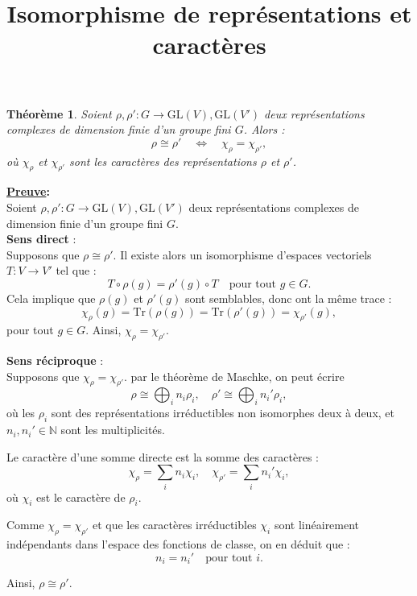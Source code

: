 \documentclass[12pt]{article}
\title{Isomorphisme de représentations et caractères}
\author{}
\date{}
\newtheorem{theoreme}{Théorème}
\begin{document}
	
	\maketitle
	
	\begin{theoreme}
		Soient \( \rho, \rho' : G \to \mathrm{GL}(V), \mathrm{GL}(V') \) deux représentations complexes de dimension finie d’un groupe fini \( G \). Alors :
		\[
		\rho \cong \rho' \quad \Leftrightarrow \quad \chi_\rho = \chi_{\rho'},
		\]
		où \( \chi_\rho \) et \( \chi_{\rho'} \) sont les caractères des représentations \( \rho \) et \( \rho' \).
	\end{theoreme}
	
	\textbf{\underline{Preuve}:}\\
Soient \( \rho, \rho' : G \to \mathrm{GL}(V), \mathrm{GL}(V') \) deux représentations complexes de dimension finie d’un groupe fini \( G \).\\
		\textbf{Sens direct} :\\
Supposons que \( \rho \cong \rho' \). Il existe alors un isomorphisme d’espaces vectoriels \( T : V \to V' \) tel que :
		\[
		T \circ \rho(g) = \rho'(g) \circ T \quad \text{pour tout } g \in G.
		\]
		Cela implique que \( \rho(g) \) et \( \rho'(g) \) sont semblables, donc ont la même trace :
		\[
		\chi_\rho(g) = \mathrm{Tr}(\rho(g)) = \mathrm{Tr}(\rho'(g)) = \chi_{\rho'}(g),
		\]
		pour tout \( g \in G \). Ainsi, \( \chi_\rho = \chi_{\rho'} \).
		
		\vspace{1em}
		\textbf{Sens réciproque} : \\
Supposons que \( \chi_\rho = \chi_{\rho'} \). par le théorème de Maschke, on peut écrire 
		\[
		\rho \cong \bigoplus_{i} n_i \rho_i, \quad \rho' \cong \bigoplus_{i} n_i' \rho_i,
		\]
		où les \( \rho_i \) sont des représentations irréductibles non isomorphes deux à deux, et \( n_i, n_i' \in \mathbb{N} \) sont les multiplicités.
		
		Le caractère d’une somme directe est la somme des caractères :
		\[
		\chi_\rho = \sum_i n_i \chi_i, \quad \chi_{\rho'} = \sum_i n_i' \chi_i,
		\]
		où \( \chi_i \) est le caractère de \( \rho_i \).
		
		Comme \( \chi_\rho = \chi_{\rho'} \) et que les caractères irréductibles \( \chi_i \) sont linéairement indépendants dans l’espace des fonctions de classe, on en déduit que :
		\[
		n_i = n_i' \quad \text{pour tout } i.
		\]
		
		Ainsi, \( \rho \cong \rho' \).
\end{document}
